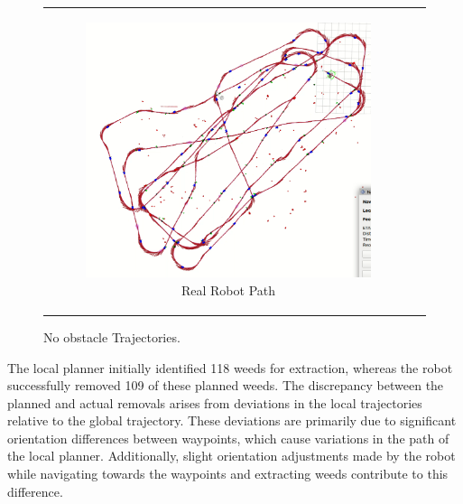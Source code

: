 \begin{figure}[H]
\begin{tabular}{cc}
\begin{subfigure}{0.4\textwidth}
            \includegraphics[width=\textwidth]{Images/real_robot/no_obs_real_path.png}
            \caption{Real Robot Path}
        \end{subfigure}
    \end{tabular}
    \caption{No obstacle Trajectories.\label{fig:no_obs_traj}} 
\end{figure}



\vspace{3mm}   


The local planner initially identified 118 weeds for extraction, whereas the robot successfully removed 109 of these planned weeds. The discrepancy between the planned and actual removals arises from deviations in the local trajectories relative to the global trajectory. These deviations are primarily due to significant orientation differences between waypoints, which cause variations in the path of the local planner. Additionally, slight orientation adjustments made by the robot while navigating towards the waypoints and extracting weeds contribute to this difference. 


